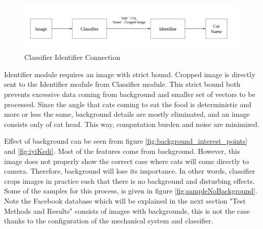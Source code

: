 \begin{figure}[h]
    \centering
    \includegraphics[width=\linewidth]{content/040_image_processing/identification/img/simpleIdentifierClassifier.png} %
    \caption{Classifier Identifier Connection}
    \label{fig:classifier_identifier_connection}
\end{figure}


Identifier module requires an image with strict bound. Cropped image is directly sent to the Identifier module from Classifier module. This strict bound both prevents excessive data coming from background and smaller set of vectors to be processed. Since the angle that cats coming to eat the food is deterministic and more or less the same, background details are mostly eliminated, and an image consists only of cat head. This way, computation burden and noise are minimized.


Effect of background can be seen from figure \ref{fig:background_interest_points} and \ref{fig:iyiKedi}. Most of the features come from background. However, this image does not properly show the correct case where cats will come directly to camera. Therefore, background will lose its importance. In other words, classifier crops images in practice such that there is no background and disturbing effects. Some of the samples for this process, is given in figure \ref{fig:sampleNoBackground}. Note the Facebook database which will be explained in the next section "Test Methods and Results" consists of images with backgrounds, this is not the case thanks to the configuration of the mechanical system and classifier.

